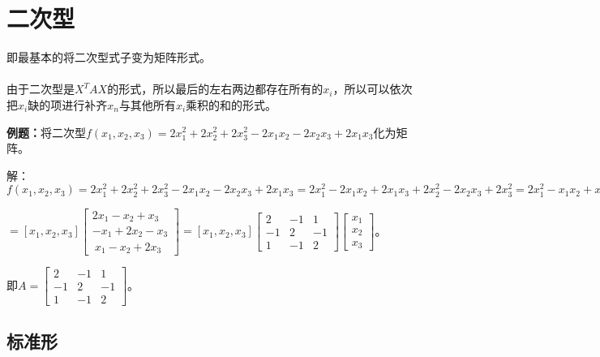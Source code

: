 
\section{二次型}

即最基本的将二次型式子变为矩阵形式。

\paragraph{}

\paragraph{}

由于二次型是$X^TAX$的形式，所以最后的左右两边都存在所有的$x_i$，所以可以依次把$x_i$缺的项进行补齐$x_n$与其他所有$x_i$乘积的和的形式。

\textbf{例题：}将二次型$f(x_1,x_2,x_3)=2x_1^2+2x_2^2+2x_3^2-2x_1x_2-2x_2x_3+2x_1x_3$化为矩阵。

解：$f(x_1,x_2,x_3)=2x_1^2+2x_2^2+2x_3^2-2x_1x_2-2x_2x_3+2x_1x_3=2x_1^2-2x_1x_2+2x_1x_3+2x_2^2-2x_2x_3+2x_3^2=2x_1^2-x_1x_2+x_1x_3+2x_2^2-x_1x_2-x_2x_3+2x_3^2+x_1x_3-x_2x_3=x_1(2x_1-x_2+x_3)+x_2(-x_1+2x_2-x_3)+x_3(x_1-x_2+2x_3)$

$=\left[x_1,x_2,x_3\right]\left[\begin{array}{c}
    2x_1-x_2+x_3 \\
    -x_1+2x_2-x_3 \\\
    x_1-x_2+2x_3
\end{array}\right]=[x_1,x_2,x_3]\left[\begin{array}{ccc}
    2 & -1 & 1\\
    -1 & 2 & -1\\
    1 & -1 & 2
\end{array}\right]\left[\begin{array}{c}
    x_1 \\
    x_2 \\
    x_3
\end{array}\right]$。

即$A=\left[\begin{array}{ccc}
    2 & -1 & 1\\
    -1 & 2 & -1\\
    1 & -1 & 2
\end{array}\right]$。

\subsection{标准形}

